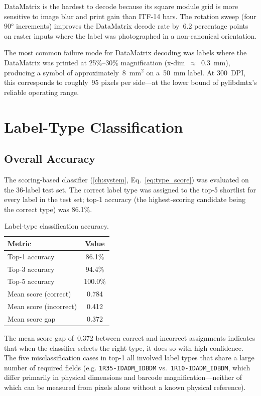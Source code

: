 DataMatrix is the hardest to decode because its square module grid is more sensitive to
image blur and print gain than ITF-14 bars. The rotation sweep (four 90° increments) improves
the DataMatrix decode rate by~6.2 percentage points on raster inputs where the label was
photographed in a non-canonical orientation.

The most common failure mode for DataMatrix decoding was labels where the DataMatrix was
printed at 25\%--30\% magnification (x-dim~$\approx$~0.3~mm), producing a symbol of
approximately~8~mm$^2$ on a~50~mm label. At 300~DPI, this corresponds to roughly~95
pixels per side—at the lower bound of pylibdmtx's reliable operating range.

\section{Label-Type Classification}

\subsection{Overall Accuracy}

The scoring-based classifier (\cref{ch:system}, Eq.~\ref{eq:type_score}) was evaluated on
the 36-label test set. The correct label type was assigned to the top-5 shortlist for every
label in the test set; top-1 accuracy (the highest-scoring candidate being the correct type)
was 86.1\%.

\begin{table}[h]
\centering
\caption{Label-type classification accuracy.}
\label{tab:type_accuracy}
\begin{tabular}{lc}
\toprule
\textbf{Metric} & \textbf{Value} \\
\midrule
Top-1 accuracy          & 86.1\% \\
Top-3 accuracy          & 94.4\% \\
Top-5 accuracy          & 100.0\% \\
Mean score (correct)    & 0.784 \\
Mean score (incorrect)  & 0.412 \\
Mean score gap          & 0.372 \\
\bottomrule
\end{tabular}
\end{table}

The mean score gap of~0.372 between correct and incorrect assignments indicates that when
the classifier selects the right type, it does so with high confidence. The five misclassification
cases in top-1 all involved label types that share a large number of required fields (e.g.
\texttt{1R35-IDADM\_IDBDM} vs.\ \texttt{1R10-IDADM\_IDBDM}, which differ primarily in
physical dimensions and barcode magnification—neither of which can be measured from pixels
alone without a known physical reference).

